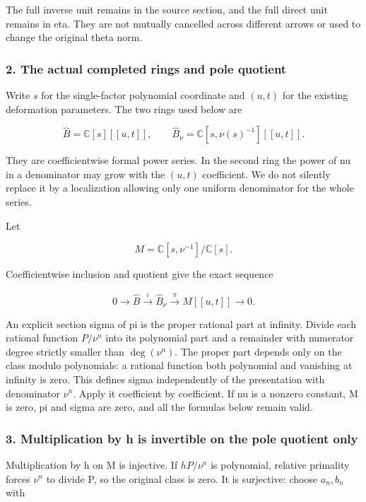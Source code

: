 The full inverse unit remains in the source section, and the full direct unit remains in eta. They are not mutually cancelled across different arrows or used to change the original theta norm.

\subsubsection{2. The actual completed rings and pole quotient}\label{endpoint-f1_unit_gauge--the-actual-completed-rings-and-pole-quotient}

Write \(s\) for the single-factor polynomial coordinate and \((u,t)\) for the existing deformation parameters. The two rings used below are

\[
\widehat B=\mathbb C[s][[u,t]],\qquad
\widehat B_\nu=\mathbb C[s,\nu(s)^{-1}][[u,t]].
\tag{UG4}
\]

They are coefficientwise formal power series. In the second ring the power of nu in a denominator may grow with the \((u,t)\) coefficient. We do not silently replace it by a localization allowing only one uniform denominator for the whole series.

Let

\[
M=\mathbb C[s,\nu^{-1}]/\mathbb C[s].
\]

Coefficientwise inclusion and quotient give the exact sequence

\[
0\longrightarrow\widehat B\xrightarrow{i}\widehat B_\nu
 \xrightarrow{\pi} M[[u,t]]\longrightarrow0.
\tag{UG5}
\]

An explicit section sigma of pi is the proper rational part at infinity. Divide each rational function \(P/\nu^n\) into its polynomial part and a remainder with numerator degree strictly smaller than \(\deg(\nu^n)\). The proper part depends only on the class modulo polynomials: a rational function both polynomial and vanishing at infinity is zero. This defines sigma independently of the presentation with denominator \(\nu^n\). Apply it coefficient by coefficient. If nu is a nonzero constant, M is zero, pi and sigma are zero, and all the formulas below remain valid.

\subsubsection{3. Multiplication by h is invertible on the pole quotient only}\label{endpoint-f1_unit_gauge--multiplication-by-h-is-invertible-on-the-pole-quotient-only}

Multiplication by h on M is injective. If \(hP/\nu^n\) is polynomial, relative primality forces \(\nu^n\) to divide P, so the original class is zero. It is surjective: choose \(a_n,b_n\) with

